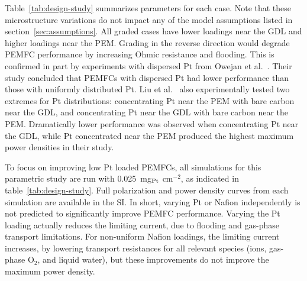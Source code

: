 \documentclass[final,3p,times,twocolumn]{elsarticle}    %
\newcommand{\crr}[1]{\color{red} #1 \color{black}}
\newcommand{\scd}[1]{\color{red} #1 \color{black}}%
\begin{document}
Table~\ref{tab:design-study} summarizes parameters for each case. \scd{Note that these microstructure variations do not impact any of the model assumptions listed in section~\ref{sec:assumptions}.} All graded cases have lower loadings near the GDL and higher loadings near the PEM. Grading in the reverse direction would degrade PEMFC performance by increasing Ohmic resistance and flooding. This is confirmed in part by experiments with dispersed Pt from Owejan et al.~\cite{bib:owejan_2013}. Their study concluded that PEMFCs with dispersed Pt had lower performance than those with uniformly distributed Pt. \crr{Liu et al.~\cite{bib:liu_2022} also experimentally tested two extremes for Pt distributions: concentrating Pt near the PEM with bare carbon near the GDL, and concentrating Pt near the GDL with bare carbon near the PEM. Dramatically lower performance was observed when concentrating Pt near the GDL, while Pt concentrated near the PEM  produced the highest maximum power densities in their study. 

To focus on improving low Pt loaded PEMFCs, all simulations for this parametric study are run with 0.025~mg$_{\rm Pt}$ cm$^{-2}$, as indicated in table~\ref{tab:design-study}.} Full polarization and power density curves from each simulation are available in the SI. In short, varying Pt or Nafion independently is not predicted to significantly improve PEMFC performance. Varying the Pt loading actually reduces the limiting current, due to flooding and gas-phase transport limitations. For non-uniform Nafion loadings, the limiting current increases, by lowering transport resistances for all relevant species (ions, gas-phase O$_2$, and liquid water), but these improvements do not improve the maximum power density.
\end{document}
